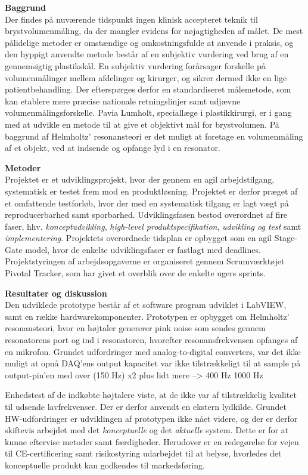 \textbf{Baggrund} \\
Der findes på nuværende tidspunkt ingen klinisk accepteret teknik til brystvolumenmåling, da der mangler evidens for nøjagtigheden af målet. De mest pålidelige metoder er omstændige og omkostningsfulde at anvende i praksis, og den hyppigt anvendte metode består af en subjektiv vurdering ved brug af en gennemsigtig plastikskål. En subjektiv vurdering forårsager forskelle på volumenmålinger mellem afdelinger og kirurger, og sikrer dermed ikke en lige patientbehandling. Der efterspørges derfor en standardiseret målemetode, som kan etablere mere præcise nationale retningslinjer samt udjævne volumenmålingsforskelle. Pavia Lumholt, speciallæge i plastikkirurgi, er i gang med at udvikle en metode til at give et objektivt mål for brystvolumen. På baggrund af Helmholtz' resonansteori er det muligt at foretage en volumenmåling af et objekt, ved at indsende og opfange lyd i en resonator.   

\textbf{Metoder} \\
Projektet er et udviklingsprojekt, hvor der gennem en agil arbejdstilgang, systematisk er testet frem mod en produktløsning. Projektet er derfor præget af et omfattende testforløb, hvor der med en systematisk tilgang er lagt vægt på reproducerbarhed samt sporbarhed. 
Udviklingsfasen bestod overordnet af fire faser, hhv. \textit{konceptudvikling}, \textit{high-level produktspecifikation}, \textit{udvikling og test} samt \textit{implementering}.
Projektets overordnede tidsplan er opbygget som en agil Stage- Gate model, hvor de enkelte udviklingsfaser er fastlagt med deadlines. Projektstyringen af arbejdsopgaverne er organiseret gennem Scrumværktøjet Pivotal Tracker, som har givet et overblik over de enkelte ugers sprints.

\textbf{Resultater og diskussion}\\

Den udviklede prototype består af et software program
udviklet i LabVIEW, samt en række hardwarekomponenter. Prototypen er opbygget om Helmholtz' resonansteori, hvor en højtaler genererer pink noise som sendes gennem resonatorens port og ind i resonatoren, hvorefter resonansfrekvensen opfanges af en mikrofon. Grundet udfordringer med analog-to-digital converters, var det ikke muligt at opnå  DAQ'ens output kapacitet var ikke tilstrækkeligt til at sample på output-pin'en med over (150 Hz) x2 plus lidt mere --> 400 Hz  1000 Hz


Enhedstest af de indkøbte højtalere viste, at de ikke var af tilstrækkelig kvalitet til udsende lavfrekvenser. Der er derfor anvendt en ekstern lydkilde. Grundet HW-udfordringer er udviklingen af prototypen ikke nået videre, og der er derfor skiftevis arbejdet med det \textit{konceptuelle} og det \textit{aktuelle} system. Dette er for at kunne eftervise metoder samt færdigheder. 
Herudover er en redegørelse for vejen til CE-certificering samt risikostyring udarbejdet til at belyse, hvorledes det konceptuelle produkt kan godkendes til markedsføring.
 
